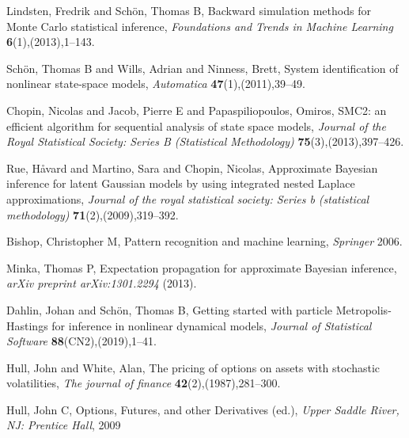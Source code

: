 \documentclass[mstat,12pt]{unswthesis}  %
\numberwithin{equation}{section}
\begin{document}
\begin{thebibliography}{999}
Lindsten, Fredrik and Sch{\"o}n, Thomas B,
Backward simulation methods for Monte Carlo statistical inference,
\textit{Foundations and Trends{\textregistered} in Machine Learning}
\textbf{6}(1),(2013),1--143.

Sch{\"o}n, Thomas B and Wills, Adrian and Ninness, Brett,
System identification of nonlinear state-space models,
\textit{Automatica}
\textbf{47}(1),(2011),39--49.

Chopin, Nicolas and Jacob, Pierre E and Papaspiliopoulos, Omiros,
SMC2: an efficient algorithm for sequential analysis of state space models,
\textit{Journal of the Royal Statistical Society: Series B (Statistical Methodology)}
\textbf{75}(3),(2013),397--426.

Rue, H{\aa}vard and Martino, Sara and Chopin, Nicolas,
Approximate Bayesian inference for latent Gaussian models by using integrated nested Laplace approximations,
\textit{Journal of the royal statistical society: Series b (statistical methodology)}
\textbf {71}(2),(2009),319--392.

 
Bishop, Christopher M,
Pattern recognition and machine learning,
\textit{Springer}
2006.  

Minka, Thomas P,
Expectation propagation for approximate Bayesian inference,
\textit{arXiv preprint arXiv:1301.2294}
(2013).

Dahlin, Johan and Sch{\"o}n, Thomas B,
Getting started with particle Metropolis-Hastings for inference in nonlinear dynamical models,
\textit{Journal of Statistical Software}
\textbf{88}(CN2),(2019),1--41.


 Hull, John and White, Alan,
The pricing of options on assets with stochastic volatilities,
\textit{The journal of finance}
\textbf{42}(2),(1987),281--300.

Hull, John C,
Options, Futures, and other Derivatives (ed.),
\textit{Upper Saddle River, NJ: Prentice Hall},
2009





\end{thebibliography}
\end{document}
